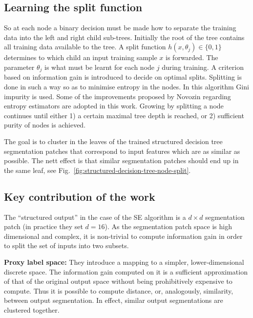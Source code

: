 \subsection{Learning the split function}
So at each node a binary decision must be made how to separate the training data into the left and right child sub-trees. Initially the root of the tree contains all training data available to the tree. A split function $h(x,\theta_j)\in\{0,1\}$ determines to which child an input training sample $x$ is forwarded. The parameter $\theta_j$ is what must be learnt for each node $j$ during training. A criterion based on information gain is introduced to decide on optimal %
splits. Splitting is done in such a way so as to minimise entropy in the nodes. In this algorithm Gini impurity is used. Some of the improvements proposed by Novozin regarding entropy estimators are adopted in this work. Growing by splitting a node continues until either 1) a certain maximal tree depth is reached, or 2) sufficient purity of nodes is achieved.

The goal is to cluster in the leaves of the trained structured decision tree segmentation patches that correspond to input features which are as similar as possible. The nett effect is that similar segmentation patches should end up in the same leaf, see Fig.~\ref{fig:structured-decision-tree-node-split}.

\subsection*{Key contribution of the work}
The ``structured output'' in the case of the SE algorithm is a $d\times d$ segmentation patch (in practice they set $d = 16$). 
As the segmentation patch space is high dimensional and complex, it is non-trivial to compute information gain in order to split the set of inputs into two subsets.

\textbf{Proxy label space:} They introduce a mapping to a simpler, lower-dimensional discrete space. The information gain computed on it is a sufficient approximation of that of the original output space without being prohibitively expensive to compute. Thus it is possible to compute distance, or, analogously, similarity, between output segmentation. In effect, similar output segmentations are clustered together.

